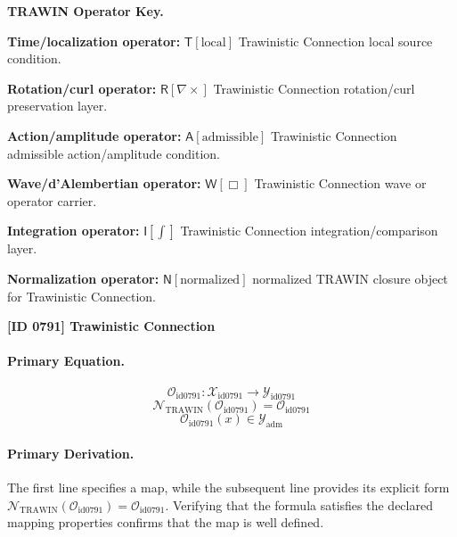 \par\vspace{0.45\baselineskip}
\noindent\begin{minipage}[t]{\linewidth}
\begingroup
\small
\raggedright
\textbf{TRAWIN Operator Key.}\par
\noindent\textbf{Time/localization operator:} $\mathsf{T}\!\left[\mathrm{local}\right]$ Trawinistic Connection local source condition.\par
\noindent\textbf{Rotation/curl operator:} $\mathsf{R}\!\left[\nabla\times\right]$ Trawinistic Connection rotation/curl preservation layer.\par
\noindent\textbf{Action/amplitude operator:} $\mathsf{A}\!\left[\mathrm{admissible}\right]$ Trawinistic Connection admissible action/amplitude condition.\par
\noindent\textbf{Wave/d'Alembertian operator:} $\mathsf{W}\!\left[\Box\right]$ Trawinistic Connection wave or operator carrier.\par
\noindent\textbf{Integration operator:} $\mathsf{I}\!\left[\int\right]$ Trawinistic Connection integration/comparison layer.\par
\noindent\textbf{Normalization operator:} $\mathsf{N}\!\left[\mathrm{normalized}\right]$ normalized TRAWIN closure object for Trawinistic Connection.\par
\endgroup
\end{minipage}

\clearpage
\noindent\textbf{[ID 0791] Trawinistic Connection}\par
\vspace{0.35em}
\paragraph{Primary Equation.}
\[
\mathcal{O}_{\mathrm{id0791}}:\mathcal{X}_{\mathrm{id0791}}\longrightarrow\mathcal{Y}_{\mathrm{id0791}}
\]
\[
\mathcal{N}_{\mathrm{TRAWIN}}(\mathcal{O}_{\mathrm{id0791}})=\mathcal{O}_{\mathrm{id0791}}
\]
\[
\mathcal{O}_{\mathrm{id0791}}(x)\in\mathcal{Y}_{\mathrm{adm}}
\]

\paragraph{Primary Derivation.}
The first line specifies a map, while the subsequent line provides its explicit form \( \mathcal{N}_{\mathrm{TRAWIN}}(\mathcal{O}_{\mathrm{id0791}})=\mathcal{O}_{\mathrm{id0791}} \). Verifying that the formula satisfies the declared mapping properties confirms that the map is well defined.
